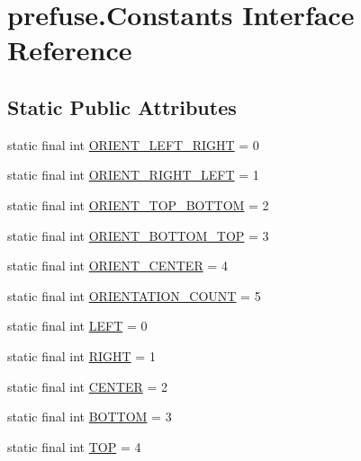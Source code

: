 \hypertarget{interfaceprefuse_1_1_constants}{\section{prefuse.\-Constants \-Interface \-Reference}
\label{interfaceprefuse_1_1_constants}
}
\subsection*{\-Static \-Public \-Attributes}
\begin{DoxyCompactItemize}
\item 
static final int \hyperlink{interfaceprefuse_1_1_constants_a6d23eaeac806f6151addc8a744c28823}{\-O\-R\-I\-E\-N\-T\-\_\-\-L\-E\-F\-T\-\_\-\-R\-I\-G\-H\-T} = 0
\item 
static final int \hyperlink{interfaceprefuse_1_1_constants_a9885120ea5c227c5b1cf2f3a79d7b347}{\-O\-R\-I\-E\-N\-T\-\_\-\-R\-I\-G\-H\-T\-\_\-\-L\-E\-F\-T} = 1
\item 
static final int \hyperlink{interfaceprefuse_1_1_constants_a2ff3bde1eaeac5a297811834137989d7}{\-O\-R\-I\-E\-N\-T\-\_\-\-T\-O\-P\-\_\-\-B\-O\-T\-T\-O\-M} = 2
\item 
static final int \hyperlink{interfaceprefuse_1_1_constants_a53792269bceb71a4965cd4c3db2d0ac1}{\-O\-R\-I\-E\-N\-T\-\_\-\-B\-O\-T\-T\-O\-M\-\_\-\-T\-O\-P} = 3
\item 
static final int \hyperlink{interfaceprefuse_1_1_constants_a755b061ca5c26c4fff53f624649d09f4}{\-O\-R\-I\-E\-N\-T\-\_\-\-C\-E\-N\-T\-E\-R} = 4
\item 
static final int \hyperlink{interfaceprefuse_1_1_constants_a1647b26e3439df6e19bdc0b3b584a2f4}{\-O\-R\-I\-E\-N\-T\-A\-T\-I\-O\-N\-\_\-\-C\-O\-U\-N\-T} = 5
\item 
static final int \hyperlink{interfaceprefuse_1_1_constants_a5cc22edffb16f306d73a6e4962071eaa}{\-L\-E\-F\-T} = 0
\item 
static final int \hyperlink{interfaceprefuse_1_1_constants_a4a653c225b2257beabe7ab6a98f4d948}{\-R\-I\-G\-H\-T} = 1
\item 
static final int \hyperlink{interfaceprefuse_1_1_constants_abb460d5070f2ca53d7d7303eab7053d7}{\-C\-E\-N\-T\-E\-R} = 2
\item 
static final int \hyperlink{interfaceprefuse_1_1_constants_ae8f773fc2747294ca6f63cc5605db03b}{\-B\-O\-T\-T\-O\-M} = 3
\item 
static final int \hyperlink{interfaceprefuse_1_1_constants_af6426f8a0cc782239115cd90e7f167e3}{\-T\-O\-P} = 4

\end{DoxyCompactItemize}
